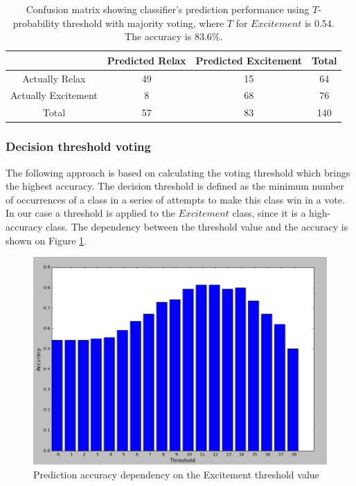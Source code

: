 \documentclass[12pt]{article}
\theoremstyle{definition}
\begin{document}
\begin{table}[H]
\begin{center}
  \begin{tabular}{ | c | c | c | c | }
    \hline
     & Predicted Relax & Predicted Excitement & Total \\ \hline
    Actually Relax & 49 & 15 & 64 \\ \hline
    Actually Excitement & 8 & 68 & 76 \\ \hline
    Total & 57 & 83 & 140 \\ 
    \hline
  \end{tabular}
\end{center}
\caption{Confusion matrix showing classifier's prediction performance using $T$-probability threshold with majority voting, where $T$ for $Excitement$ is 0.54. The accuracy is 83.6\%.} 
\end{table}

\subsubsection{Decision threshold voting}

The following approach is based on calculating the voting threshold which brings the highest accuracy. The decision threshold is defined as the minimum number of occurrences of a class in a series of attempts to make this class win in a vote. In our case a threshold is applied to the $Excitement$ class, since it is a high-accuracy class. The dependency between the threshold value and the accuracy is shown on Figure \ref{fig:threshold_accuracy_curve}.

\begin{figure} [H]
\begin{center}
\includegraphics[width=1\textwidth]{threshold_accuracy_curve}
\caption{Prediction accuracy dependency on the Excitement threshold value}
\label{fig:threshold_accuracy_curve}
\end{center}
\end{figure}
\end{document}
